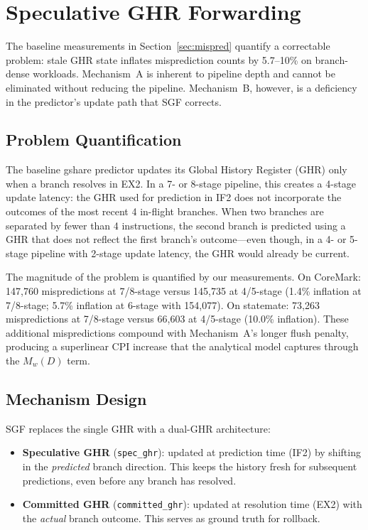 \documentclass[journal]{IEEEtran}
\begin{document}
\begin{table}[t]
\begin{table}[t]
\begin{table}[t]
\begin{table}[t]
\begin{table}[t]
\begin{table}[t]
\section{Speculative GHR Forwarding}
\label{sec:sgf}

The baseline measurements in Section~\ref{sec:mispred} quantify a correctable problem: stale GHR state inflates misprediction counts by 5.7--10\% on branch-dense workloads. Mechanism~A is inherent to pipeline depth and cannot be eliminated without reducing the pipeline. Mechanism~B, however, is a deficiency in the predictor's update path that SGF corrects.

\subsection{Problem Quantification}

The baseline gshare predictor updates its Global History Register (GHR) only when a branch resolves in EX2. In a 7- or 8-stage pipeline, this creates a 4-stage update latency: the GHR used for prediction in IF2 does not incorporate the outcomes of the most recent 4 in-flight branches. When two branches are separated by fewer than 4 instructions, the second branch is predicted using a GHR that does not reflect the first branch's outcome---even though, in a 4- or 5-stage pipeline with 2-stage update latency, the GHR would already be current.

The magnitude of the problem is quantified by our measurements. On CoreMark: 147{,}760 mispredictions at 7/8-stage versus 145{,}735 at 4/5-stage (1.4\% inflation at 7/8-stage; 5.7\% inflation at 6-stage with 154{,}077). On statemate: 73{,}263 mispredictions at 7/8-stage versus 66{,}603 at 4/5-stage (10.0\% inflation). These additional mispredictions compound with Mechanism~A's longer flush penalty, producing a superlinear CPI increase that the analytical model captures through the $M_w(D)$ term.

\subsection{Mechanism Design}

SGF replaces the single GHR with a dual-GHR architecture:
\begin{itemize}
\item \textbf{Speculative GHR} (\texttt{spec\_ghr}): updated at prediction time (IF2) by shifting in the \emph{predicted} branch direction. This keeps the history fresh for subsequent predictions, even before any branch has resolved.
\item \textbf{Committed GHR} (\texttt{committed\_ghr}): updated at resolution time (EX2) with the \emph{actual} branch outcome. This serves as ground truth for rollback.
\end{itemize}


\end{table}
\end{table}
\end{table}
\end{table}
\end{table}
\end{table}
\end{document}
